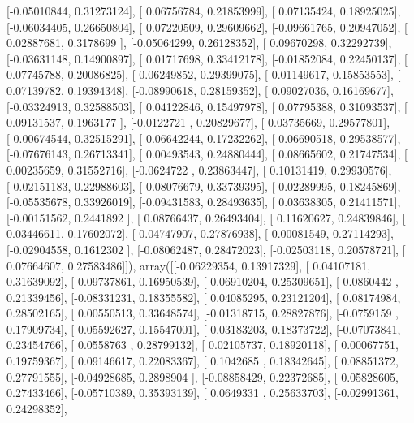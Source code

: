 \documentclass{article}
\begin{document}
       [-0.05010844,  0.31273124],
       [ 0.06756784,  0.21853999],
       [ 0.07135424,  0.18925025],
       [-0.06034405,  0.26650804],
       [ 0.07220509,  0.29609662],
       [-0.09661765,  0.20947052],
       [ 0.02887681,  0.3178699 ],
       [-0.05064299,  0.26128352],
       [ 0.09670298,  0.32292739],
       [-0.03631148,  0.14900897],
       [ 0.01717698,  0.33412178],
       [-0.01852084,  0.22450137],
       [ 0.07745788,  0.20086825],
       [ 0.06249852,  0.29399075],
       [-0.01149617,  0.15853553],
       [ 0.07139782,  0.19394348],
       [-0.08990618,  0.28159352],
       [ 0.09027036,  0.16169677],
       [-0.03324913,  0.32588503],
       [ 0.04122846,  0.15497978],
       [ 0.07795388,  0.31093537],
       [ 0.09131537,  0.1963177 ],
       [-0.0122721 ,  0.20829677],
       [ 0.03735669,  0.29577801],
       [-0.00674544,  0.32515291],
       [ 0.06642244,  0.17232262],
       [ 0.06690518,  0.29538577],
       [-0.07676143,  0.26713341],
       [ 0.00493543,  0.24880444],
       [ 0.08665602,  0.21747534],
       [ 0.00235659,  0.31552716],
       [-0.0624722 ,  0.23863447],
       [ 0.10131419,  0.29930576],
       [-0.02151183,  0.22988603],
       [-0.08076679,  0.33739395],
       [-0.02289995,  0.18245869],
       [-0.05535678,  0.33926019],
       [-0.09431583,  0.28493635],
       [ 0.03638305,  0.21411571],
       [-0.00151562,  0.2441892 ],
       [ 0.08766437,  0.26493404],
       [ 0.11620627,  0.24839846],
       [ 0.03446611,  0.17602072],
       [-0.04747907,  0.27876938],
       [ 0.00081549,  0.27114293],
       [-0.02904558,  0.1612302 ],
       [-0.08062487,  0.28472023],
       [-0.02503118,  0.20578721],
       [ 0.07664607,  0.27583486]]), array([[-0.06229354,  0.13917329],
       [ 0.04107181,  0.31639092],
       [ 0.09737861,  0.16950539],
       [-0.06910204,  0.25309651],
       [-0.0860442 ,  0.21339456],
       [-0.08331231,  0.18355582],
       [ 0.04085295,  0.23121204],
       [ 0.08174984,  0.28502165],
       [ 0.00550513,  0.33648574],
       [-0.01318715,  0.28827876],
       [-0.0759159 ,  0.17909734],
       [ 0.05592627,  0.15547001],
       [ 0.03183203,  0.18373722],
       [-0.07073841,  0.23454766],
       [ 0.0558763 ,  0.28799132],
       [ 0.02105737,  0.18920118],
       [ 0.00067751,  0.19759367],
       [ 0.09146617,  0.22083367],
       [ 0.1042685 ,  0.18342645],
       [ 0.08851372,  0.27791555],
       [-0.04928685,  0.2898904 ],
       [-0.08858429,  0.22372685],
       [ 0.05828605,  0.27433466],
       [-0.05710389,  0.35393139],
       [ 0.0649331 ,  0.25633703],
       [-0.02991361,  0.24298352],
\end{document}
